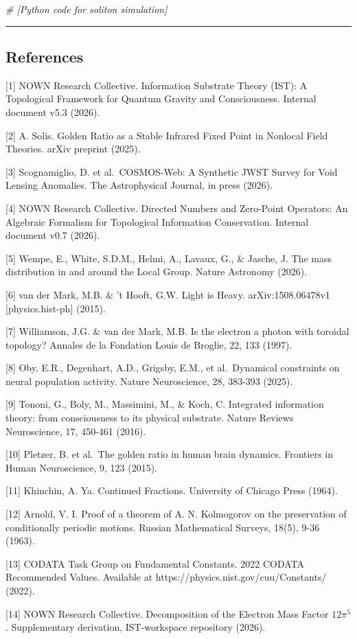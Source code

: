 \documentclass[
]{article}
\newenvironment{Shaded}{}{}
\newcommand{\CommentTok}[1]{\textcolor[rgb]{0.38,0.63,0.69}{\textit{#1}}}
\begin{document}
\begin{Shaded}
\begin{Highlighting}[]
\CommentTok{\# [Python code for soliton simulation]}
\end{Highlighting}
\end{Shaded}

\begin{center}\rule{0.5\linewidth}{0.5pt}\end{center}

\subsection{References}\label{references}

{[}1{]} NOWN Research Collective. Information Substrate Theory (IST): A
Topological Framework for Quantum Gravity and Consciousness. Internal
document v5.3 (2026).

{[}2{]} A. Solis. Golden Ratio as a Stable Infrared Fixed Point in
Nonlocal Field Theories. arXiv preprint (2025).

{[}3{]} Scognamiglio, D. et al.~COSMOS-Web: A Synthetic JWST Survey for
Void Lensing Anomalies. The Astrophysical Journal, in press (2026).

{[}4{]} NOWN Research Collective. Directed Numbers and Zero-Point
Operators: An Algebraic Formalism for Topological Information
Conservation. Internal document v0.7 (2026).

{[}5{]} Wempe, E., White, S.D.M., Helmi, A., Lavaux, G., \& Jasche, J.
The mass distribution in and around the Local Group. Nature Astronomy
(2026).

{[}6{]} van der Mark, M.B. \& 't Hooft, G.W. Light is Heavy.
arXiv:1508.06478v1 {[}physics.hist-ph{]} (2015).

{[}7{]} Williamson, J.G. \& van der Mark, M.B. Is the electron a photon
with toroidal topology? Annales de la Fondation Louis de Broglie, 22,
133 (1997).

{[}8{]} Oby, E.R., Degenhart, A.D., Grigsby, E.M., et al.~Dynamical
constraints on neural population activity. Nature Neuroscience, 28,
383-393 (2025).

{[}9{]} Tononi, G., Boly, M., Massimini, M., \& Koch, C. Integrated
information theory: from consciousness to its physical substrate. Nature
Reviews Neuroscience, 17, 450-461 (2016).

{[}10{]} Pletzer, B. et al.~The golden ratio in human brain dynamics.
Frontiers in Human Neuroscience, 9, 123 (2015).

{[}11{]} Khinchin, A. Ya. Continued Fractions. University of Chicago
Press (1964).

{[}12{]} Arnold, V. I. Proof of a theorem of A. N. Kolmogorov on the
preservation of conditionally periodic motions. Russian Mathematical
Surveys, 18(5), 9-36 (1963).

{[}13{]} CODATA Task Group on Fundamental Constants. 2022 CODATA
Recommended Values. Available at https://physics.nist.gov/cuu/Constants/
(2022).

{[}14{]} NOWN Research Collective. Decomposition of the Electron Mass
Factor \(12\pi^5\). Supplementary derivation, IST-workspace repository
(2026).
\end{document}
